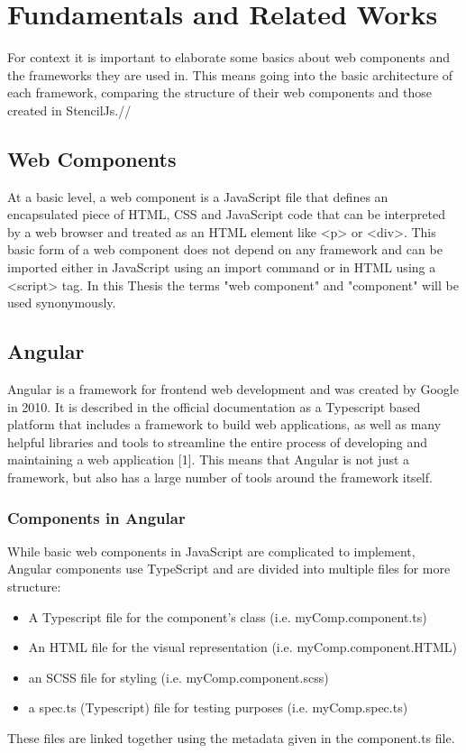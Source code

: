 \chapter{Fundamentals and Related Works}
\label{cha:Fundamentals}
For context it is important to elaborate some basics about web components and the frameworks they are used in. This means going into the basic architecture of each framework, comparing the structure of their web components and those created in StencilJs.//

\section{Web Components}
At a basic level, a web component is a JavaScript file that defines an encapsulated piece of HTML, CSS and JavaScript code that can be interpreted by a web browser and treated as an HTML element like <p> or <div>. This basic form of a web component does not depend on any framework and can be imported either in JavaScript using an import command or in HTML using a <script> tag. In this Thesis the terms "web component" and "component" will be used synonymously.

\section{Angular}
Angular is a framework for frontend web development and was created by Google in 2010. It is described in the official documentation as a Typescript based platform that includes a framework to build web applications, as well as many helpful libraries and tools to streamline the entire process of developing and maintaining a web application [1]. This means that Angular is not just a framework, but also has a large number of tools around the framework itself.

\subsection{Components in Angular}
While basic web components in JavaScript are complicated to implement, Angular components use TypeScript and are divided into multiple files for more structure:

\begin{itemize}
\item A Typescript file for the component’s class (i.e. myComp.component.ts)
\item An HTML file for the visual representation (i.e. myComp.component.HTML)
\item an SCSS file for styling (i.e. myComp.component.scss)
\item a spec.ts (Typescript) file for testing purposes (i.e. myComp.spec.ts)
\end{itemize}
These files are linked together using the metadata given in the component.ts file.

